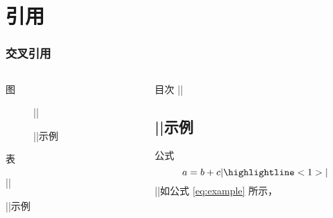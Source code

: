\section{引用}
\begin{frame}[fragile]
  \frametitle{交叉引用}

  
  \begin{columns}
    \begin{column}{0.5\textwidth}
      \begin{codeblock}[]{图}
\begin{figure}
||  \caption{||示例}\label{fig:example}
\end{figure}
      \end{codeblock}
      \begin{codeblock}[]{表}
\begin{table}
||  \caption{||示例}\label{tab:example}
\end{table}
      \end{codeblock}
    \end{column}
    \begin{column}{0.5\textwidth}
\begin{codeblock}[]{目次}
||\section{||示例}\label{sec:example}
\end{codeblock}

\begin{codeblock}[]{公式}
\begin{equation}
  a = b + c
|\highlightline<1>|\label{eq:example}
\end{equation}
||如公式 \eqref{eq:example} 所示，
\end{codeblock}
    \end{column}
  \end{columns}
\end{frame}

